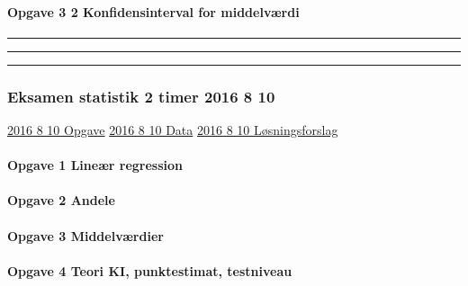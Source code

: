 \documentclass[]{book}
\let\oldparagraph\paragraph
\renewcommand{\paragraph}[1]{\oldparagraph{#1}\mbox{}}
\begin{document}
\hypertarget{opgave-3-2-konfidensinterval-for-middelvrdi}{%
\paragraph{Opgave 3 2 Konfidensinterval for
middelværdi}\label{opgave-3-2-konfidensinterval-for-middelvrdi}}

\begin{center}\rule{0.5\linewidth}{\linethickness}\end{center}

\begin{center}\rule{0.5\linewidth}{\linethickness}\end{center}

\begin{center}\rule{0.5\linewidth}{\linethickness}\end{center}

\hypertarget{eksamen-statistik-2-timer-2016-8-10}{%
\subsubsection{Eksamen statistik 2 timer 2016 8
10}\label{eksamen-statistik-2-timer-2016-8-10}}

\href{https://drive.google.com/uc?export=download\&id=0B1E7VnhxsDMlTy1NVjFBMDRLZFk}{2016
8 10 Opgave}
\href{https://drive.google.com/uc?export=download\&id=0B1E7VnhxsDMlcVdQUVFjUEp2SUE}{2016
8 10 Data}
\href{https://drive.google.com/uc?export=download\&id=0B1E7VnhxsDMlQnNjMk9XZDZKWUU}{2016
8 10 Løsningsforslag}

\hypertarget{opgave-1-liner-regression}{%
\paragraph{Opgave 1 Lineær regression}\label{opgave-1-liner-regression}}

\hypertarget{opgave-2-andele}{%
\paragraph{Opgave 2 Andele}\label{opgave-2-andele}}

\hypertarget{opgave-3-middelvrdier}{%
\paragraph{Opgave 3 Middelværdier}\label{opgave-3-middelvrdier}}

\hypertarget{opgave-4-teori-ki-punktestimat-testniveau}{%
\paragraph{Opgave 4 Teori KI, punktestimat,
testniveau}\label{opgave-4-teori-ki-punktestimat-testniveau}}
\end{document}

